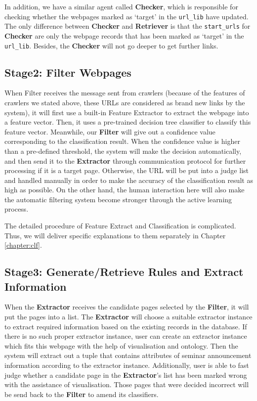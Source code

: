 In addition, we have a similar agent called \textbf{Checker}, which is responsible for checking whether the webpages marked as `target' in the \texttt{url\_lib} have updated. The only difference between \textbf{Checker} and \textbf{Retriever} is that the \texttt{start\_urls} for \textbf{Checker} are only the webpage records that has been marked as `target' in the \texttt{url\_lib}. Besides, the \textbf{Checker} will not go deeper to get further links.


\subsection{Stage2: Filter Webpages}
When Filter receives the message sent from crawlers (because of the features of crawlers we stated above, these URLs are considered as brand new links by the system), it will first use a built-in Feature Extractor to extract the webpage into a feature vector. Then, it uses a pre-trained decision tree classifier to classify this feature vector. Meanwhile, our \textbf{Filter} will give out a confidence value corresponding to the classification result. When the confidence value is higher than a pre-defined threshold, the system will make the decision automatically, and then send it to the \textbf{Extractor} through communication protocol for further processing if it is a target page. Otherwise, the URL will be put into a judge list and handled manually in order to make the accuracy of the classification result as high as possible. On the other hand, the human interaction here will also make the automatic filtering system become stronger through the active learning process.

The detailed procedure of Feature Extract and Classification is complicated. Thus, we will deliver specific explanations to them separately in Chapter \ref{chapter:clf}.

\subsection{Stage3: Generate/Retrieve Rules and Extract Information}
When the \textbf{Extractor} receives the candidate pages selected by the \textbf{Filter}, it will put the pages into a list. The \textbf{Extractor} will choose a suitable extractor instance to extract required information based on the existing records in the database. If there is no such proper extractor instance, user can create an extractor instance which fits this webpage with the help of visualisation and ontology. Then the system will extract out a tuple that contains attributes of seminar announcement information according to the extractor instance. Additionally, user is able to fast judge whether a candidate page in the \textbf{Extractor}'s list has been marked wrong with the assistance of visualisation. Those pages that were decided incorrect will be send back to the \textbf{Filter} to amend its classifiers. 

